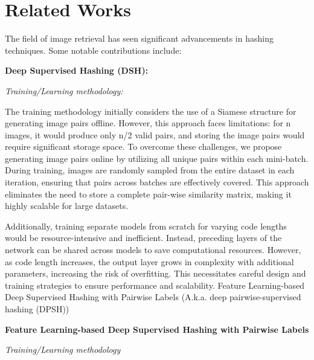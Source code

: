 \section{Related Works}

The field of image retrieval has seen significant advancements in hashing techniques. Some notable contributions include:

\textbf{Deep Supervised Hashing (DSH):}

\textit{Training/Learning methodology:}

The training methodology initially considers the use of a Siamese structure for generating image pairs offline. However, this approach faces limitations: for n images, it would produce only n/2 valid pairs, and storing the image pairs would require significant storage space. To overcome these challenges, we propose generating image pairs online by utilizing all unique pairs within each mini-batch. During training, images are randomly sampled from the entire dataset in each iteration, ensuring that pairs across batches are effectively covered. This approach eliminates the need to store a complete pair-wise similarity matrix, making it highly scalable for large datasets.

Additionally, training separate models from scratch for varying code lengths would be resource-intensive and inefficient. Instead, preceding layers of the network can be shared across models to save computational resources. However, as code length increases, the output layer grows in complexity with additional parameters, increasing the risk of overfitting. This necessitates careful design and training strategies to ensure performance and scalability.
Feature Learning-based Deep Supervised Hashing with Pairwise Labels (A.k.a. deep pairwise-supervised hashing (DPSH)) \cite{Liu_2016_CVPR}

\textbf{Feature Learning-based Deep Supervised Hashing with Pairwise Labels}

\textit{Training/Learning methodology}


